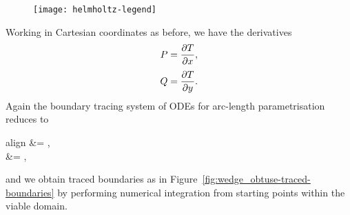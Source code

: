 \begin{figure}
  \texttt{[image: helmholtz-legend]}
  \begin{minipage}[t]{0.5\textwidth}
  \end{minipage}
  \begin{minipage}[t]{0.5\textwidth}
  \end{minipage}
\end{figure}

\begin{figure}
\end{figure}

Working in Cartesian coordinates as before,
we have the derivatives
\begin{align}
  P &= \pder{T}{x},
    \label{eq:re-entrant-gradient-x-component} \\[\tallspace]
  Q &= \pder{T}{y}.
    \label{eq:re-entrant-gradient-y-component}
\end{align}
Again the boundary tracing system of ODEs for arc-length parametrisation
reduces to
\begin{important}{align}
   &= ,
    \label{eq:re-entrant-tracing-ode-arc-length-parametrisation-x}
    \\[\tallspace]
   &= ,
    \label{eq:re-entrant-tracing-ode-arc-length-parametrisation-y}
\end{important}
and we obtain traced boundaries
as in Figure~\ref{fig:wedge_obtuse-traced-boundaries}
by performing numerical integration
from starting points within the viable domain.

